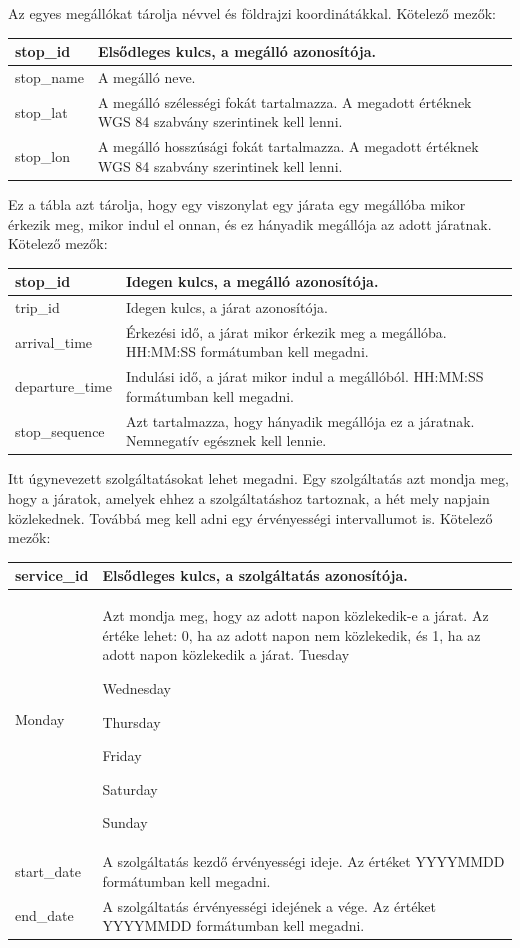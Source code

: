 
Az egyes megállókat tárolja névvel és földrajzi koordinátákkal.
Kötelező mezők:

\begin{tabular}{|p{3cm}|p{10cm}|}
\hline
stop\_id & Elsődleges kulcs, a megálló azonosítója. \\
\hline
stop\_name & A megálló neve. \\
\hline
stop\_lat & A megálló szélességi fokát tartalmazza. A megadott értéknek WGS 84 szabvány szerintinek kell lenni. \\
\hline
stop\_lon & A megálló hosszúsági fokát tartalmazza. A megadott értéknek WGS 84 szabvány szerintinek kell lenni. \\
\hline
\end{tabular}


Ez a tábla azt tárolja, hogy egy viszonylat egy járata egy megállóba mikor érkezik meg, mikor indul el onnan, és ez hányadik megállója az adott járatnak.
Kötelező mezők:

\begin{tabular}{|p{3cm}|p{10cm}|}
\hline
stop\_id & Idegen kulcs, a megálló azonosítója. \\
\hline
trip\_id & Idegen kulcs, a járat azonosítója. \\
\hline
arrival\_time & Érkezési idő, a járat mikor érkezik meg a megállóba. HH:MM:SS formátumban kell megadni. \\
\hline
departure\_time & Indulási idő, a járat mikor indul a megállóból. HH:MM:SS formátumban kell megadni. \\
\hline
stop\_sequence & Azt tartalmazza, hogy hányadik megállója ez a járatnak. Nemnegatív egésznek kell lennie. \\
\hline
\end{tabular}


Itt úgynevezett szolgáltatásokat lehet megadni. Egy szolgáltatás azt mondja meg, hogy a járatok, amelyek ehhez a szolgáltatáshoz tartoznak, a hét mely napjain közlekednek. Továbbá meg kell adni egy érvényességi intervallumot is.
Kötelező mezők:

\begin{tabular}{|p{3cm}|p{10cm}|}
\hline
service\_id & Elsődleges kulcs, a szolgáltatás azonosítója. \\
\hline
Monday & Azt mondja meg, hogy az adott napon közlekedik-e a járat.
Az értéke lehet:
0, ha az adott napon nem közlekedik, és
1, ha az adott napon közlekedik a járat.
Tuesday

Wednesday

Thursday

Friday

Saturday

Sunday\\
\hline
start\_date & A szolgáltatás kezdő érvényességi ideje. Az értéket YYYYMMDD formátumban kell megadni. \\
\hline
end\_date & A szolgáltatás érvényességi idejének a vége. Az értéket YYYYMMDD formátumban kell megadni. \\
\hline
\end{tabular}

